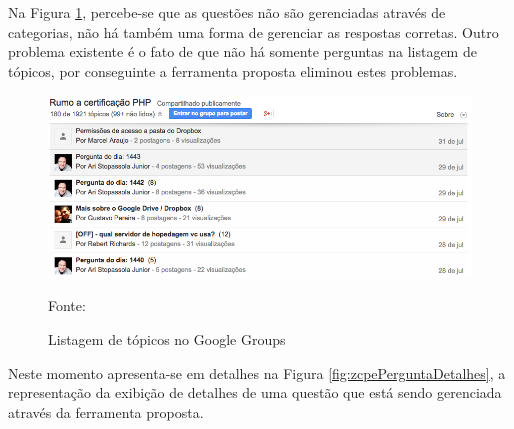 \FloatBarrier 	%

Na Figura \ref{fig:googleGroupsListagemTopicos}, percebe-se que as questões não
são gerenciadas através de categorias, não há também uma forma de gerenciar as
respostas corretas. Outro problema existente é o fato de que não há somente
perguntas na listagem de tópicos, por conseguinte a ferramenta proposta eliminou estes
problemas.

\begin{figure}[h!tb]
	\caption{Listagem de tópicos no Google Groups}
	\label{fig:googleGroupsListagemTopicos}

	\centering
	\includegraphics[width=\textwidth]{images/resultados/google-groups-listagem.png}

	\centering
	\footnotesize Fonte: \fonteOAutor
\end{figure}

\FloatBarrier 	%

Neste momento apresenta-se em detalhes na Figura \ref{fig:zcpePerguntaDetalhes},
a representação da exibição de detalhes de uma questão que está sendo gerenciada
através da ferramenta proposta.

